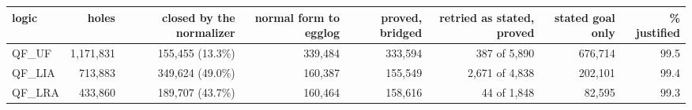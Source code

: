 \begin{tabular}{lrrrrrrr}
\toprule
logic & holes & closed by the normalizer & normal form to egglog & proved, bridged & retried as stated, proved & stated goal only & \% justified \\
\midrule
QF\_UF & 1,171,831 & 155,455 (13.3\%) & 339,484 & 333,594 & 387 of 5,890 & 676,714 & 99.5 \\
QF\_LIA & 713,883 & 349,624 (49.0\%) & 160,387 & 155,549 & 2,671 of 4,838 & 202,101 & 99.4 \\
QF\_LRA & 433,860 & 189,707 (43.7\%) & 160,464 & 158,616 & 44 of 1,848 & 82,595 & 99.3 \\
\bottomrule
\end{tabular}

